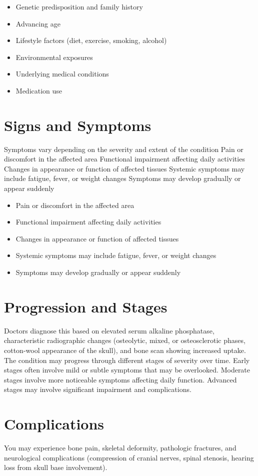 \begin{itemize}[noitemsep]
  \item Genetic predisposition and family history
  \item Advancing age
  \item Lifestyle factors (diet, exercise, smoking, alcohol)
  \item Environmental exposures
  \item Underlying medical conditions
  \item Medication use
\end{itemize}
\section{Signs and Symptoms}
Symptoms vary depending on the severity and extent of the condition Pain or discomfort in the affected area Functional impairment affecting daily activities Changes in appearance or function of affected tissues Systemic symptoms may include fatigue, fever, or weight changes Symptoms may develop gradually or appear suddenly

\begin{itemize}[noitemsep]
  \item Pain or discomfort in the affected area
  \item Functional impairment affecting daily activities
  \item Changes in appearance or function of affected tissues
  \item Systemic symptoms may include fatigue, fever, or weight changes
  \item Symptoms may develop gradually or appear suddenly
\end{itemize}
\section{Progression and Stages}
Doctors diagnose this based on elevated serum alkaline phosphatase, characteristic radiographic changes (osteolytic, mixed, or osteosclerotic phases, cotton-wool appearance of the skull), and bone scan showing increased uptake. The condition may progress through different stages of severity over time. Early stages often involve mild or subtle symptoms that may be overlooked. Moderate stages involve more noticeable symptoms affecting daily function. Advanced stages may involve significant impairment and complications.
\section{Complications}
You may experience bone pain, skeletal deformity, pathologic fractures, and neurological complications (compression of cranial nerves, spinal stenosis, hearing loss from skull base involvement).

